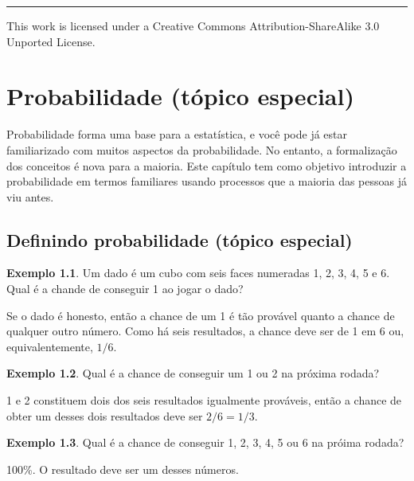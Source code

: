 \documentclass[
]{book}
\theoremstyle{definition}
\theoremstyle{definition}
\newtheorem{example}{Exemplo}[chapter]
\theoremstyle{definition}
\theoremstyle{definition}
\theoremstyle{remark}
\begin{document}
\begin{center}\rule{0.5\linewidth}{0.5pt}\end{center}

This work is licensed under a Creative Commons Attribution-ShareAlike 3.0 Unported License.

\hypertarget{ch2-prob}{%
\chapter{Probabilidade (tópico especial)}\label{ch2-prob}}

Probabilidade forma uma base para a estatística, e você pode já estar familiarizado com muitos aspectos da probabilidade. No entanto, a formalização dos conceitos é nova para a maioria. Este capítulo tem como objetivo introduzir a probabilidade em termos familiares usando processos que a maioria das pessoas já viu antes.

\hypertarget{basicsOfProbability}{%
\section{Definindo probabilidade (tópico especial)}\label{basicsOfProbability}}

\begin{example}
\protect\hypertarget{exm:probOf1}{}{\label{exm:probOf1} }Um dado é um cubo com seis faces numeradas 1, 2, 3, 4, 5 e 6. Qual é a chande de conseguir 1 ao jogar o dado?
\end{example}

Se o dado é honesto, então a chance de um 1 é tão provável quanto a chance de qualquer outro número. Como há seis resultados, a chance deve ser de 1 em 6 ou, equivalentemente, \(1/6\).

\begin{example}
\protect\hypertarget{exm:probOf1Or2}{}{\label{exm:probOf1Or2} }Qual é a chance de conseguir um 1 ou 2 na próxima rodada?
\end{example}

1 e 2 constituem dois dos seis resultados igualmente prováveis, então a chance de obter um desses dois resultados deve ser \(2/6 = 1/3\).

\begin{example}
\protect\hypertarget{exm:probOf123456}{}{\label{exm:probOf123456} }Qual é a chance de conseguir 1, 2, 3, 4, 5 ou 6 na próima rodada?
\end{example}

100\%. O resultado deve ser um desses números.
\end{document}
